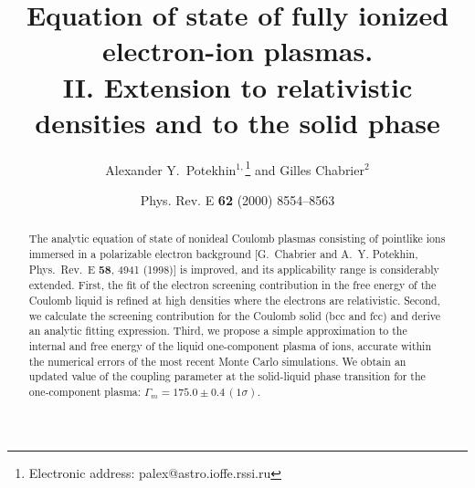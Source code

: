 
\newcommand{\beq}{\begin{equation}}
\newcommand{\eeq}{\end{equation}}
\newcommand{\bea}{\begin{eqnarray}}
\newcommand{\eea}{\end{eqnarray}}
\newcommand{\req}[1]{Eq.~(\ref{#1})}
\newcommand{\gcc}{{\rm~g\,cm}^{-3}}
\newcommand{\ApJ}[1]{Astrophys.~J. {\bf #1}}
\newcommand{\AandA}[1]{Astron.\ Astrophys. {\bf #1}}
\newcommand{\JPB}[1]{J.\ Phys.\ B {\bf #1}}
\newcommand{\PRL}[1]{Phys.\ Rev.\ Lett. {\bf #1}}
\newcommand{\PR}[2]{Phys.\ Rev.\ #1 {\bf #2}}


\draft
\title{Equation of state of fully ionized electron-ion plasmas.\\
II. Extension to relativistic densities and to the solid phase}

\author{
Alexander Y.~Potekhin$^{1,}$\thanks{Electronic address:
palex@astro.ioffe.rssi.ru}
 and 
Gilles Chabrier$^{2}$ %
}
\address{$^1$Ioffe Physical-Technical Institute,
     194021 St.\ Petersburg, Russia}
\address{$^2$%
     Ecole Normale Sup\'erieure de Lyon,
       CRAL (UMR CNRS No.\ 5574),
     69364 Lyon Cedex 07, France}

\date{Phys. Rev. E {\bf 62} (2000) 8554--8563}
\maketitle

\begin{abstract}
The analytic equation of state of nonideal Coulomb plasmas
consisting of pointlike ions immersed in a polarizable
electron background
[G.~Chabrier and A.~Y. Potekhin, \PR{E}{58},  4941 (1998)]
is improved, and its applicability range is considerably extended.
First, the fit of the electron screening contribution
in the free energy of the Coulomb liquid
is refined at high densities 
where the electrons are relativistic.
Second, we calculate the screening contribution for
the Coulomb solid (bcc and fcc)
and derive an analytic fitting expression.
Third, we propose a simple
approximation to the internal and free energy
of the liquid one-component plasma of ions,
accurate within the numerical errors of the most recent
Monte Carlo simulations.
We obtain an updated value of the coupling parameter at
the solid-liquid phase transition for the one-component plasma:
$\Gamma_m=175.0\pm0.4\,(1\sigma)$.
\end{abstract}

